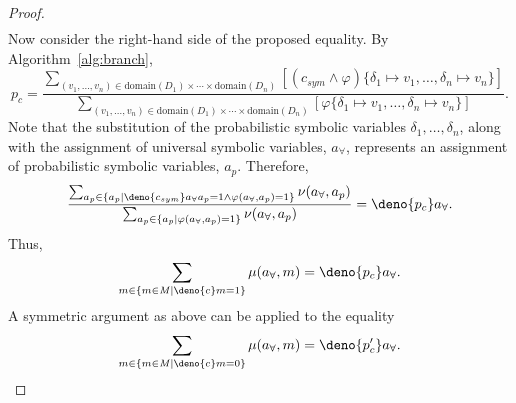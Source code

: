 \documentclass[acmsmall,review,anonymous]{acmart}\settopmatter{printfolios=true,printccs=false,printacmref=false}
\begin{document}
\begin{proof}
\begin{align*}
  \end{align*}
  Now consider the right-hand side of the proposed equality. By Algorithm~\ref{alg:branch},
  \[
    p_c = \frac{\displaystyle\sum_{(v_1,\ldots,v_n) \in \mathrm{domain}(D_1) \times \cdots\times \mathrm{domain}(D_n)} [(c_{sym} \wedge \varphi)\{\delta_1 \mapsto v_1,\ldots,\delta_n \mapsto v_n\}]}{\displaystyle\sum_{(v_1,\ldots,v_n) \in \mathrm{domain}(D_1) \times \cdots\times \mathrm{domain}(D_n)}[\varphi\{\delta_1 \mapsto v_1,\ldots,\delta_n \mapsto v_n\}]}.
  \]
  Note that the substitution of the probabilistic symbolic variables $\delta_1,\ldots,\delta_n$, along with the assignment of universal symbolic variables, $a_{\forall}$, represents an assignment of probabilistic symbolic variables, $a_p$. Therefore,
  \[
    \frac{\sum_{a_p \in \{a_p \mid \deno{c_{sym}} a_{\forall} a_p = 1 \wedge \varphi(a_{\forall},a_p) = 1\}}\nu(a_{\forall},a_p)}{\sum_{a_p \in \{a_p \mid \varphi(a_{\forall},a_p) = 1\}}\nu(a_{\forall},a_p)} = \deno{p_c} a_{\forall}.
  \]
  Thus,
  \[
    \sum_{m \in \{m \in \mathit{M} \mid \deno{c}m = 1\}}\mu(a_{\forall},m) = \deno{p_c} a_{\forall}.
  \]
  A symmetric argument as above can be applied to the equality
  \[
    \sum_{m \in \{m \in \mathit{M} \mid \deno{c}m = 0\}}\mu(a_{\forall},m) = \deno{p_{c}'} a_{\forall}.
  \]
\end{proof}
\end{document}
